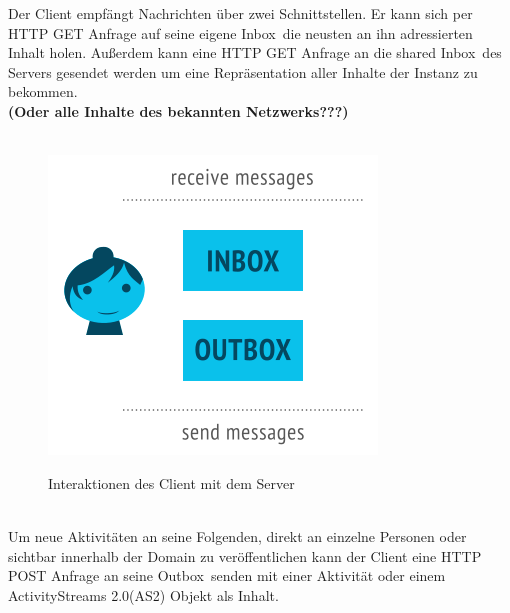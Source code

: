	Der Client empfängt Nachrichten über zwei Schnittstellen. Er kann sich per HTTP GET Anfrage auf seine eigene \glqq Inbox\grqq~die neusten an ihn adressierten Inhalt holen. Außerdem kann eine HTTP GET Anfrage an die \glqq shared Inbox\grqq~des Servers gesendet werden um eine Repräsentation aller Inhalte der Instanz zu bekommen.\\ \textbf{(Oder alle Inhalte des bekannten Netzwerks???)}\\\\
	\begin{figure}[h]
		\centering
		\includegraphics[scale=0.6]{figures/inbox-outbox.png}
		\label{Client zu Server Interaktionen}
		\caption{Interaktionen des Client mit dem Server}
	\end{figure}\\
	Um neue Aktivitäten an seine Folgenden, direkt an einzelne Personen oder sichtbar innerhalb der Domain zu veröffentlichen kann der Client eine HTTP POST Anfrage an seine \glqq Outbox\grqq~senden mit einer Aktivität oder einem ActivityStreams 2.0(AS2) Objekt als Inhalt. 
	

